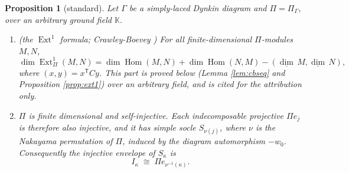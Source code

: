 \documentclass[reqno]{amsart}
\theoremstyle{plain}
\newtheorem{proposition}[theorem]{Proposition}
\theoremstyle{definition}
\DeclareMathOperator{\Hom}{Hom}
\DeclareMathOperator{\Ext}{Ext}
\newcommand{\dimv}{\underline{\dim}\,}
\newcommand{\ka}{\kappa}
\newcommand{\Pia}{\Pi}
\begin{document}
\begin{proposition}[standard]\label{prop:Pifacts}
Let $\Gamma$ be a simply-laced Dynkin diagram and $\Pia=\Pia_\Gamma$, over an
arbitrary ground field $\mathbb{K}$.
\begin{enumerate}
\item[\textup{(a)}] \textup{(the $\Ext^1$ formula; Crawley-Boevey
\cite[Lem.~1]{CB})}
For all finite-dimensional $\Pia$-modules $M,N$,
\[
   \dim\Ext^1_\Pia(M,N)=\dim\Hom(M,N)+\dim\Hom(N,M)-(\dimv M,\dimv N),
\]
where $(x,y)=x^{\mathsf T}Cy$.  \emph{This part is proved below}
\textup{(}Lemma \ref{lem:cbseq} and Proposition \ref{prop:ext1}\textup{)}
over an arbitrary field, and \cite{CB} is cited for the attribution only.
\item[\textup{(b)}] $\Pia$ is finite dimensional and self-injective.  Each
indecomposable projective $\Pia e_j$ is therefore also injective, and it has
simple socle $S_{\nu(j)}$, where $\nu$ is the Nakayama permutation of $\Pia$,
induced by the diagram automorphism $-w_0$.  Consequently the injective
envelope of $S_\ka$ is
\begin{equation}\label{eq:Ika}
   I_\ka\;\cong\;\Pia e_{\nu^{-1}(\ka)} .
\end{equation}
\end{enumerate}
\end{proposition}
\end{document}
